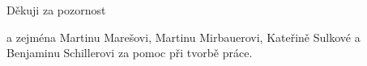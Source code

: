 \documentclass[czech]{beamer}
\begin{document}
	\begin{frame}[focus]
		Děkuji za pozornost
		\vspace{0.5em}

		\normalsize\normalfont a zejména Martinu Marešovi, Martinu Mirbauerovi, Kateřině Sulkové a Benjaminu Schillerovi za pomoc při tvorbě práce.

		\vspace{1em}

		\begin{figure}
			\centering
			
			\caption*{\href{https://xkcd.com/655/}{\color{white}{https://xkcd.com/655/}}}
		\end{figure}
	\end{frame}
\end{document}

